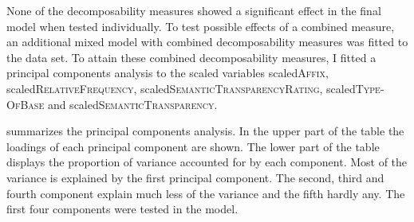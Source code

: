 None of the decomposability measures showed a significant effect in the final model when tested individually. To test possible effects of a combined  measure, an additional mixed model with combined decomposability measures was fitted to the data set.  
To attain these combined decomposability measures, I fitted a principal components analysis to the scaled variables scaled\textsc{Affix}, scaled\textsc{RelativeFrequency}, scaled\textsc{SemanticTransparencyRating}, scaled\textsc{Type-OfBase} and scaled\textsc{SemanticTransparency}.





 summarizes the principal components analysis. In the upper part of the table the loadings of each principal component are shown. The lower part of the table displays the proportion of variance accounted for by each component. 
Most of the variance is explained by the first principal component. The second, third and fourth component explain much less of the variance and the fifth hardly any.  The first four components were tested in the model. 


\begin{table}
	\caption{ Summary of principal components}
	\label{tbl: summary PC im exp}

	
	
\end{table}



